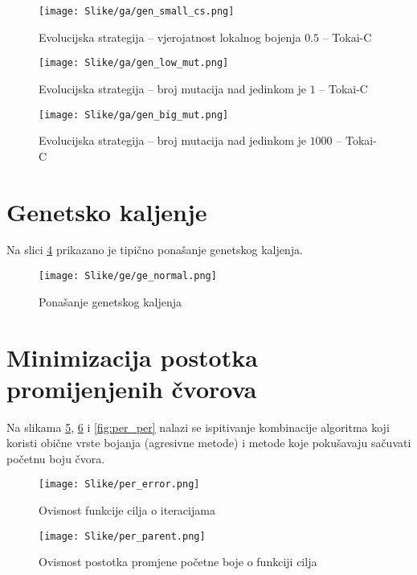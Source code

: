 \documentclass[times, utf8, diplomski, numeric]{fer}
\begin{document}
\begin{figure}[htb]
	\texttt{[image: Slike/ga/gen\_small\_cs.png]}
	\caption{Evolucijska strategija -- vjerojatnost lokalnog bojenja $0.5$ -- Tokai-C}
	\label{fig:gen_small_cs}
\end{figure}

\begin{figure}[htb]
	\texttt{[image: Slike/ga/gen\_low\_mut.png]}
	\caption{Evolucijska strategija -- broj mutacija nad jedinkom je $1$ -- Tokai-C}
	\label{fig:gen_low_mut}
\end{figure}

\begin{figure}[htb]
	\texttt{[image: Slike/ga/gen\_big\_mut.png]}
	\caption{Evolucijska strategija -- broj mutacija nad jedinkom je $1000$ -- Tokai-C}
	\label{fig:gen_big_mut}
\end{figure}

\clearpage

\section{Genetsko kaljenje}

Na slici \ref{fig:ge_normal} prikazano je tipično ponašanje genetskog kaljenja.

\begin{figure}[htb]
	\texttt{[image: Slike/ge/ge\_normal.png]}
	\caption{Ponašanje genetskog kaljenja}
	\label{fig:ge_normal}
\end{figure}

\section{Minimizacija postotka promijenjenih čvorova}

Na slikama \ref{fig:per_error}, \ref{fig:per_parent} i \ref{fig:per_per} nalazi se ispitivanje kombinacije algoritma koji koristi obične vrste bojanja (agresivne metode) i metode koje pokušavaju sačuvati početnu boju čvora.

\begin{figure}[htb]
	\texttt{[image: Slike/per\_error.png]}
  \caption{Ovisnost funkcije cilja o iteracijama}
  \label{fig:per_error}
\end{figure}

\begin{figure}[htb]
	\texttt{[image: Slike/per\_parent.png]}
  \caption{Ovisnost postotka promjene početne boje o funkciji cilja}
	\label{fig:per_parent}
\end{figure}
\end{document}
